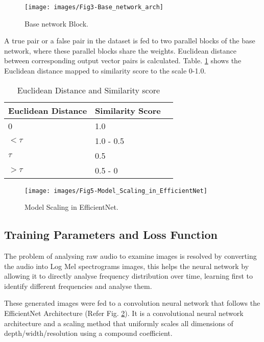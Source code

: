 \documentclass[10pt,twocolumn]{article}
\begin{document}
\begin{figure}
\centering
\texttt{[image: images/Fig3-Base\_network\_arch]}
\caption{Base network Block.}
\label{FIG:Base_network_Block}
\end{figure}


A true pair or a false pair in the dataset is fed to two parallel blocks of the base network, where these parallel blocks share the weights. Euclidean distance between corresponding output vector pairs is calculated. Table. \ref{TBL:Euclidean_Distance_and_Similarity_score} shows the Euclidean distance mapped to similarity score to the scale 0-1.0. %

\begin{table}
\centering
\caption{Euclidean Distance and Similarity score}
\label{TBL:Euclidean_Distance_and_Similarity_score}
\begin{tabular}{ p{2cm} p{2cm}   p{2cm}}
 \hline \hline
Euclidean Distance  &Similarity Score \\
 \hline
0   &1.0 \\
 $<\tau$  &1.0 - 0.5 \\
$\tau$ &0.5 \\
 $>\tau$	&0.5 - 0 \\
\hline
\end{tabular}
\end{table}%


\begin{figure}
\centering
\texttt{[image: images/Fig5-Model\_Scaling\_in\_EfficientNet]}
\caption{Model Scaling in EfficientNet.}
\label{FIG:Model_Scaling_in_EfficientNet}
\end{figure}

\subsection{Training Parameters and Loss Function}
The problem of analysing raw audio to examine images is resolved by converting the audio into Log Mel spectrograms images, this helps the neural network by allowing it to directly analyse frequency distribution over time, learning first to identify different frequencies and analyse them.

These generated images were fed to a convolution neural network that follows the EfficientNet Architecture (Refer Fig. \ref{FIG:Model_Scaling_in_EfficientNet}). It is a convolutional neural network architecture and a scaling method that uniformly scales all dimensions of depth/width/resolution using a compound coefficient. 
\end{document}
